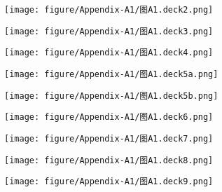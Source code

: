 \begin{figure}[htbp]
\small
    \centering
    \texttt{[image: figure/Appendix-A1/图A1.deck2.png]}
    \caption{}
    \label{图A1.deck2}
\end{figure}

\begin{figure}[htbp]
\small
    \centering
    \texttt{[image: figure/Appendix-A1/图A1.deck3.png]}
    \caption{}
    \label{图A1.deck3}
\end{figure}

\begin{figure}[htbp]
\small
    \centering
    \texttt{[image: figure/Appendix-A1/图A1.deck4.png]}
    \caption{}
    \label{图A1.deck4}
\end{figure}

\begin{figure}[htbp]
\small
    \centering
    \texttt{[image: figure/Appendix-A1/图A1.deck5a.png]}
    \caption{}
    \label{图A1.deck5a}
\end{figure}

\begin{figure}[htbp]
\small
    \centering
    \texttt{[image: figure/Appendix-A1/图A1.deck5b.png]}
    \caption{}
    \label{图A1.deck5b}
\end{figure}

\begin{figure}[htbp]
\small
    \centering
    \texttt{[image: figure/Appendix-A1/图A1.deck6.png]}
    \caption{}
    \label{图A1.deck6}
\end{figure}

\begin{figure}[htbp]
\small
    \centering
    \texttt{[image: figure/Appendix-A1/图A1.deck7.png]}
    \caption{}
    \label{图A1.deck7}
\end{figure}

\begin{figure}[htbp]
\small
    \centering
    \texttt{[image: figure/Appendix-A1/图A1.deck8.png]}
    \caption{}
    \label{图A1.deck8}
\end{figure}

\begin{figure}[htbp]
\small
    \centering
    \texttt{[image: figure/Appendix-A1/图A1.deck9.png]}
    \caption{}
    \label{图A1.deck9}
\end{figure}

